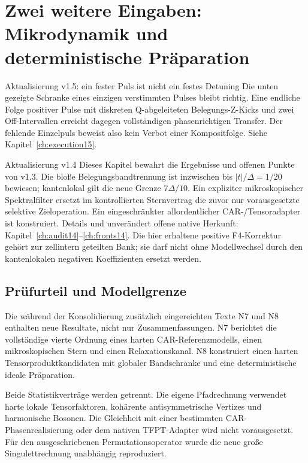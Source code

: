 \chapter{Zwei weitere Eingaben: Mikrodynamik und deterministische Präparation}
\label{ch:newinputs13}
\begin{bild}{Aktualisierung v1.5: ein fester Puls ist nicht ein festes Detuning}
Die unten gezeigte Schranke eines einzigen verstimmten Pulses bleibt richtig. Eine endliche Folge positiver Pulse mit diskreten Q-abgeleiteten Belegungs-Z-Kicks und zwei Off-Intervallen erreicht dagegen vollständigen phasenrichtigen Transfer. Der fehlende Einzelpuls beweist also kein Verbot einer Kompositfolge. Siehe Kapitel~\ref{ch:execution15}.
\end{bild}
\begin{bild}{Aktualisierung v1.4}
Dieses Kapitel bewahrt die Ergebnisse und offenen Punkte von v1.3. Die bloße Belegungsbandtrennung ist inzwischen bis $|t|/\Delta=1/20$ bewiesen; kantenlokal gilt die neue Grenze $7\Delta/10$. Ein expliziter mikroskopischer Spektralfilter ersetzt im kontrollierten Sternvertrag die zuvor nur vorausgesetzte selektive Zieloperation. Ein eingeschränkter allordentlicher CAR-/Tensoradapter ist konstruiert. Details und unverändert offene native Herkunft: Kapitel~\ref{ch:audit14}--\ref{ch:fronts14}. Die hier erhaltene positive F4-Korrektur gehört zur zellintern geteilten Bank; sie darf nicht ohne Modellwechsel durch den kantenlokalen negativen Koeffizienten ersetzt werden.
\end{bild}
\section{Prüfurteil und Modellgrenze}
Die während der Konsolidierung zusätzlich eingereichten Texte N7 und N8 enthalten neue Resultate, nicht nur Zusammenfassungen. N7 berichtet die vollständige vierte Ordnung eines harten CAR-Referenzmodells, einen mikroskopischen Stern und einen Relaxationskanal. N8 konstruiert einen harten Tensorproduktkandidaten mit globaler Bandschranke und eine deterministische ideale Präparation.

Beide Statistikverträge werden getrennt. Die eigene Pfadrechnung verwendet harte lokale Tensorfaktoren, kohärente antisymmetrische Vertizes und harmonische Bosonen. Die Gleichheit mit einer bestimmten CAR-Phasenrealisierung oder dem nativen TFPT-Adapter wird nicht vorausgesetzt. Für den ausgeschriebenen Permutationsoperator wurde die neue große Singulettrechnung unabhängig reproduziert.

